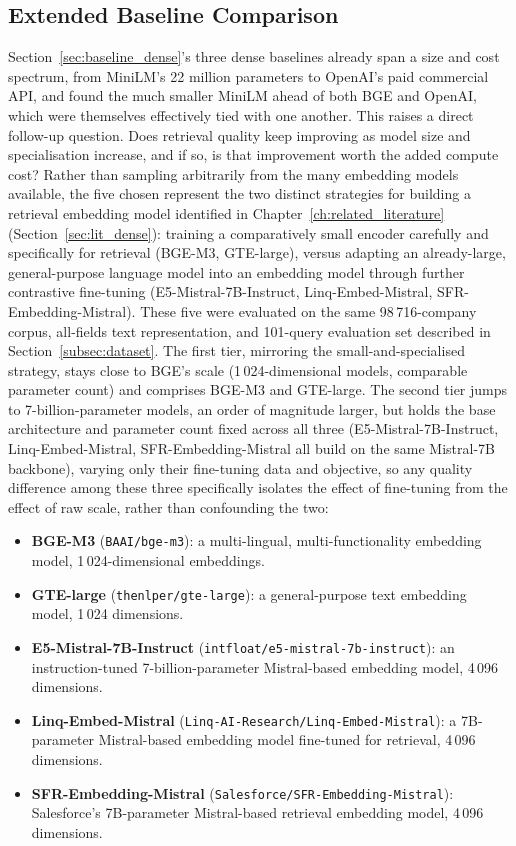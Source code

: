 \documentclass[a4paper,oneside,bibliography=totoc]{scrbook}
\begin{document}
\subsection{Extended Baseline Comparison}
\label{sec:extended_baselines}

Section~\ref{sec:baseline_dense}'s three dense baselines already span a size and cost spectrum, from MiniLM's 22 million parameters to OpenAI's paid commercial API, and found the much smaller MiniLM ahead of both BGE and OpenAI, which were themselves effectively tied with one another. This raises a direct follow-up question. Does retrieval quality keep improving as model size and specialisation increase, and if so, is that improvement worth the added compute cost? Rather than sampling arbitrarily from the many embedding models available, the five chosen represent the two distinct strategies for building a retrieval embedding model identified in Chapter~\ref{ch:related_literature} (Section~\ref{sec:lit_dense}): training a comparatively small encoder carefully and specifically for retrieval (BGE-M3, GTE-large), versus adapting an already-large, general-purpose language model into an embedding model through further contrastive fine-tuning (E5-Mistral-7B-Instruct, Linq-Embed-Mistral, SFR-Embedding-Mistral). These five were evaluated on the same 98\,716-company corpus, all-fields text representation, and 101-query evaluation set described in Section~\ref{subsec:dataset}. The first tier, mirroring the small-and-specialised strategy, stays close to BGE's scale (1\,024-dimensional models, comparable parameter count) and comprises BGE-M3 and GTE-large. The second tier jumps to 7-billion-parameter models, an order of magnitude larger, but holds the base architecture and parameter count fixed across all three (E5-Mistral-7B-Instruct, Linq-Embed-Mistral, SFR-Embedding-Mistral all build on the same Mistral-7B backbone), varying only their fine-tuning data and objective, so any quality difference among these three specifically isolates the effect of fine-tuning from the effect of raw scale, rather than confounding the two:

\begin{itemize}
\item \textbf{BGE-M3} (\texttt{BAAI/bge-m3}): a multi-lingual, multi-functionality embedding model, 1\,024-dimensional embeddings.
\item \textbf{GTE-large} (\texttt{thenlper/gte-large}): a general-purpose text embedding model, 1\,024 dimensions.
\item \textbf{E5-Mistral-7B-Instruct} (\texttt{intfloat/e5-mistral-7b-instruct}): an instruction-tuned 7-billion-parameter Mistral-based embedding model, 4\,096 dimensions.
\item \textbf{Linq-Embed-Mistral} (\texttt{Linq-AI-Research/Linq-Embed-Mistral}): a 7B-parameter Mistral-based embedding model fine-tuned for retrieval, 4\,096 dimensions.
\item \textbf{SFR-Embedding-Mistral} (\texttt{Salesforce/SFR-Embedding-Mistral}): Salesforce's 7B-parameter Mistral-based retrieval embedding model, 4\,096 dimensions.
\end{itemize}
\end{document}
